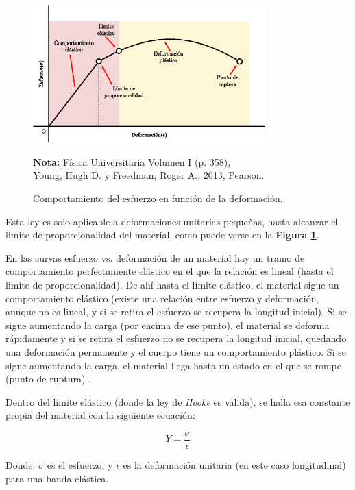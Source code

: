 \documentclass[letter,11pt]{article}
\newcommand{\source}[1]{\vspace{-11pt} \caption*{\small{\textbf{Nota:} {#1}}}}
\begin{document}
\begin{figure}
\centering
\includegraphics[width=0.80\textwidth]{resources/f1.eps}
\caption{Comportamiento del esfuerzo en función de la deformación.}
\label{figura1}
\source{Física Universitaria Volumen I (p. 358), \\
Young, Hugh D. y Freedman, Roger A., 2013, Pearson.}
\end{figure}

Esta ley es solo aplicable a deformaciones unitarias pequeñas, hasta alcanzar
el limite de proporcionalidad del material, como puede verse en la
\textbf{Figura \ref{figura1}}.

En las curvas esfuerzo vs. deformación de un material hay un tramo de
comportamiento perfectamente elástico en el que la relación es lineal (hasta el
limite de proporcionalidad). De ahí hasta el límite elástico, el material sigue
un comportamiento elástico (existe una relación entre esfuerzo y deformación,
aunque no es lineal, y si se retira el esfuerzo se recupera la
longitud inicial). Si se sigue aumentando la carga (por encima de ese punto), el
material se deforma rápidamente y si se retira el esfuerzo no se recupera la
longitud inicial, quedando una deformación permanente y el cuerpo tiene un
comportamiento plástico. Si se sigue aumentando la carga, el material llega
hasta un estado en el que se rompe (punto de ruptura) \cite{Young&Freedman}.

Dentro del limite elástico (donde la ley de \emph{Hooke} es valida), se halla
esa constante propia del material con la siguiente ecuación:

\begin{equation}
    Y = \frac{\sigma}{\epsilon}
\label{young1}
\end{equation}
\vspace{0.10cm}

Donde: $\sigma$ es el esfuerzo, y $\epsilon$ es la deformación unitaria (en este
caso longitudinal) para una banda elástica.
\end{document}
